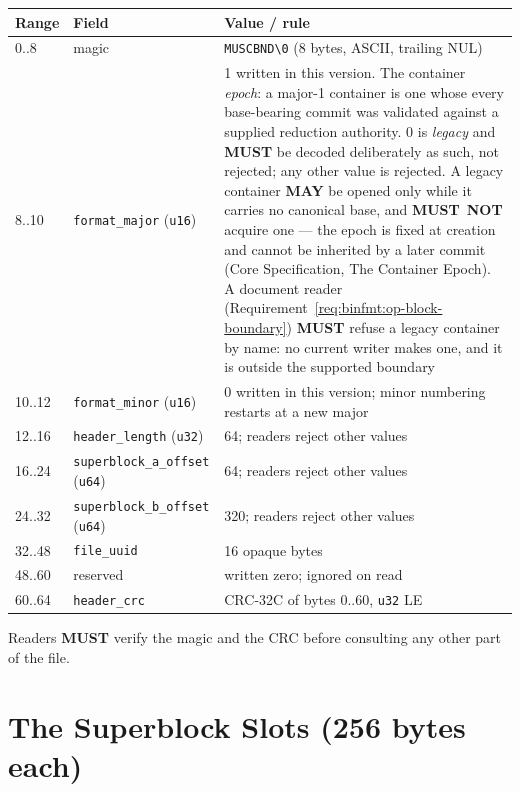 \documentclass[11pt,letterpaper]{report}
\newcommand{\tablenums}[1]{{\addfontfeatures{Numbers={Lining,Tabular}}#1}}
\newcommand{\sectionsc}[1]{{\addfontfeatures{Letters=SmallCaps}#1}}
\newcommand{\MUST}{\textbf{MUST}}
\newcommand{\MUSTNOT}{\textbf{MUST}\nobreak\ \textbf{NOT}}
\newcommand{\MAY}{\textbf{MAY}}
\begin{document}
\begingroup\small
\begin{longtable}{p{0.8in} p{1.7in} p{3.1in}}
  \toprule
  \textbf{Range} & \textbf{Field} & \textbf{Value / rule} \\
  \midrule
  \endhead
  \tablenums{0..8} & magic & \texttt{MUSCBND\textbackslash0} (8 bytes, ASCII,
    trailing NUL) \\
  \tablenums{8..10} & \texttt{format\_major} (\texttt{u16}) & \tablenums{1}
    written in this version. The container \emph{epoch}: a major-1
    container is one whose every base-bearing commit was validated
    against a supplied reduction authority. \tablenums{0} is
    \emph{legacy} and \MUST{} be decoded deliberately as such, not
    rejected; any other value is rejected. A legacy container \MAY{}
    be opened only while it carries no canonical base, and \MUSTNOT{}
    acquire one --- the epoch is fixed at creation and cannot be
    inherited by a later commit (Core Specification,
    \sectionsc{The Container Epoch}). A document reader
    (Requirement~\ref{req:binfmt:op-block-boundary}) \MUST{} refuse a
    legacy container by name: no current writer makes one, and it is
    outside the supported boundary \\
  \tablenums{10..12} & \texttt{format\_minor} (\texttt{u16}) & \tablenums{0}
    written in this version; minor numbering restarts at a new major \\
  \tablenums{12..16} & \texttt{header\_length} (\texttt{u32}) &
    \tablenums{64}; readers reject other values \\
  \tablenums{16..24} & \texttt{superblock\_a\_offset} (\texttt{u64}) &
    \tablenums{64}; readers reject other values \\
  \tablenums{24..32} & \texttt{superblock\_b\_offset} (\texttt{u64}) &
    \tablenums{320}; readers reject other values \\
  \tablenums{32..48} & \texttt{file\_uuid} & 16 opaque bytes \\
  \tablenums{48..60} & reserved & written zero; ignored on read \\
  \tablenums{60..64} & \texttt{header\_crc} & CRC-32C of bytes
    \tablenums{0..60}, \texttt{u32} LE \\
  \bottomrule
\end{longtable}
\endgroup

Readers \MUST{} verify the magic and the CRC before consulting any other part
of the file.

\section{The Superblock Slots (256 bytes each)}
\label{sec:bundle:superblock}
\end{document}
